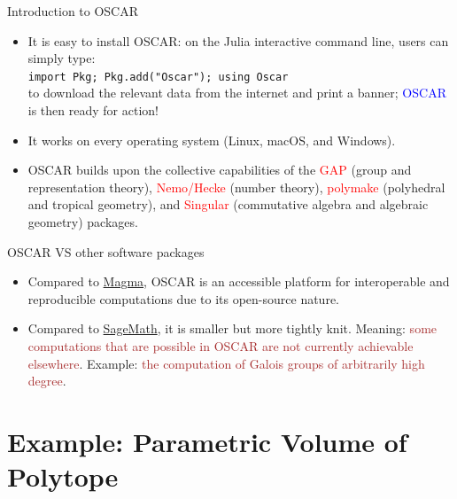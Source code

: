\documentclass[aspectratio=169,xcolor=dvipsnames]{beamer}
\newcommand{\code}[1]{\texttt{#1}}
\begin{document}
\begin{frame}{Introduction to OSCAR}
    \begin{itemize}
    \item It is easy to install OSCAR: on the Julia interactive command line, users can simply type:\\
        \code{import Pkg; Pkg.add("Oscar"); using Oscar}\\
        to download the relevant data from the internet and print a banner; \textcolor{blue}{OSCAR} is then ready for action!
        \item It works on every operating system (Linux, macOS, and Windows).
        \item OSCAR builds upon the collective capabilities of the \textcolor{red}{GAP} (group and representation theory), \textcolor{red}{Nemo/Hecke} (number theory), \textcolor{red}{polymake} (polyhedral and tropical geometry), and \textcolor{red}{Singular} (commutative algebra and algebraic geometry) packages. 
    \end{itemize}
\end{frame}


\begin{frame}{OSCAR VS other software packages}
    \begin{itemize}
        \item Compared to \textcolor{blue}{\href{http://magma.maths.usyd.edu.au/magma/}{Magma}}, OSCAR is an accessible platform for interoperable and reproducible computations due to its open-source nature.
        \item Compared to \textcolor{blue}{\href{https://www.sagemath.org/}{SageMath}}, it is smaller but more tightly knit. Meaning: \textcolor{brown}{some computations that are possible in OSCAR are not currently achievable elsewhere}. Example: \textcolor{brown}{the computation of Galois groups of arbitrarily high degree}.
    \end{itemize}
\end{frame}

\section{Example: Parametric Volume of Polytope}
\end{document}
